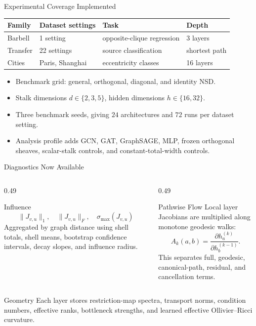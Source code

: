 \documentclass[11pt]{beamer}
\begin{document}
\begin{frame}{Experimental Coverage Implemented}
  \begin{table}
    \centering
    \small
    \begin{tabular}{llll}
      \toprule
      Family & Dataset settings & Task & Depth \\
      \midrule
      Barbell & 1 setting & opposite-clique regression & 3 layers \\
      Transfer & 22 settings & source classification & shortest path \\
      Cities & Paris, Shanghai & eccentricity classes & 16 layers \\
      \bottomrule
    \end{tabular}
  \end{table}

  \begin{itemize}
    \item Benchmark grid: general, orthogonal, diagonal, and identity NSD.
    \item Stalk dimensions \(d\in\{2,3,5\}\), hidden dimensions \(h\in\{16,32\}\).
    \item Three benchmark seeds, giving \(24\) architectures and \(72\) runs per dataset setting.
    \item Analysis profile adds GCN, GAT, GraphSAGE, MLP, frozen orthogonal sheaves,
    scalar-stalk controls, and constant-total-width controls.
  \end{itemize}
\end{frame}

\begin{frame}{Diagnostics Now Available}
  \begin{columns}[T,totalwidth=\textwidth]
    \begin{column}{0.49\textwidth}
      \begin{block}{Influence}
        \[
          \|J_{v,u}\|_1,\quad
          \|J_{v,u}\|_F,\quad
          \sigma_{\max}(J_{v,u})
        \]
        Aggregated by graph distance using shell totals, shell means, bootstrap
        confidence intervals, decay slopes, and influence radius.
      \end{block}
    \end{column}
    \begin{column}{0.49\textwidth}
      \begin{block}{Pathwise Flow}
        Local layer Jacobians are multiplied along monotone geodesic walks:
        \[
          A_k(a,b)=
          \frac{\partial h_a^{(k)}}{\partial h_b^{(k-1)}}.
        \]
        This separates full, geodesic, canonical-path, residual, and cancellation terms.
      \end{block}
    \end{column}
  \end{columns}

  \vspace{0.2cm}
  \begin{block}{Geometry}
    Each layer stores restriction-map spectra, transport norms, condition numbers,
    effective ranks, bottleneck strengths, and learned effective Ollivier--Ricci curvature.
  \end{block}
\end{frame}
\end{document}
